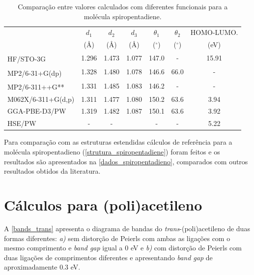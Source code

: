 \documentclass[
	12pt,				%
	openright,			%
	twoside,			%
	a4paper,			%
	chapter=TITLE,		%
	english,			%
	french,				%
	spanish,			%
	brazil				%
	]{abntex2}
\begin{document}
\begin{apendicesenv}
	

	\begin{table}[!ht]
		\centering
		\caption{Comparação entre valores calculados com diferentes funcionais para a molécula spiropentadiene.}
		\label{dados_spiropentadieno}
		\renewcommand{\arraystretch}{1.2}
		\small\selectfont
		\begin{tabular}{l|cccccc}
			\hline\hline
						            &  $d_1$  & $d_2$ & $d_3$ & $\theta_1$ & $\theta_2$ & HOMO-LUMO.     \\
			  		 	            & (Å) & (Å) & (Å) & ($^\circ$) & ($^\circ$)  & (eV)    \\ \hline
			HF/STO-3G \textsuperscript{\cite{kao1978ab}}  & 1.296   & 1.473   & 1.077   & 147.0      &    -     &  15.91  \\
			MP2/6-31+G(dp) \textsuperscript{\cite{shavitt1991ab}}  & 1.328   & 1.480   & 1.078   & 146.6      &    66.0     &  -  \\
			MP2/6-311++G** \textsuperscript{\cite{dodziuk2001theoretical}}  & 1.331   & 1.485   & 1.083   & 146.2      &    -     &  -  \\
			M062X/6-311+G(d,p)      & 1.311   & 1.477   & 1.080   & 150.2     &   63.6     &  3.94   \\
			GGA-PBE-D3/PW           & 1.319   & 1.482   & 1.087   & 150.1     &   63.6      & 3.92        \\
			HSE/PW                  &  -   & -   &         &     -       &      -       & 5.22        \\
			\hline\hline         
		\end{tabular}
	\end{table}
	
	
	Para comparação com as estruturas estendidas cálculos de referência para a molécula spiropentadieno (\autoref{strutura_spiropentadiene}) foram feitos e os resultados são apresentados na \autoref{dados_spiropentadieno}, comparados com outros resultados obtidos da literatura. 

\section{Cálculos para (poli)acetileno} \label{chap:bands_poliacetileno}
	
	A \autoref{bands_trans} apresenta o diagrama de bandas do \textit{trans}-(poli)acetileno de duas formas diferentes: \textit{a)} sem distorção de Peierls com ambas as ligações com o mesmo comprimento e \textit{band gap} igual a 0 eV e \textit{b)} com distorção de Peierls com duas ligações de comprimentos diferentes e apresentando \textit{band gap} de aproximadamente 0.3 eV.
	

\end{apendicesenv}
\end{document}
